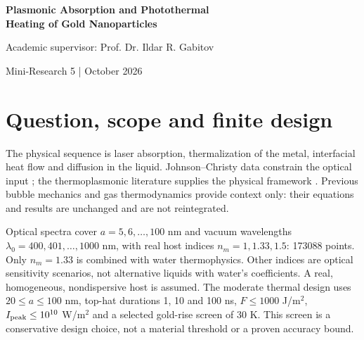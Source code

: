 \documentclass[10pt,a4paper]{article}
\begin{document}
\begin{center}
{\LARGE\bfseries Plasmonic Absorption and Photothermal\\[3pt] Heating of Gold Nanoparticles}\par
\vspace{6pt}{\large Dimitri Bolt}\par
Academic supervisor: Prof. Dr. Ildar R. Gabitov\par
Mini-Research 5 \quad |  October 2026
\end{center}
\begin{abstract}
I quantify the optical-energy channel from laser irradiation to isolated gold spheres and surrounding water. Experimental room-temperature optical constants, a passive dipole approximation and a converged Mie calculation are linked to depth-integrated attenuation and an energy-conservative transient conduction model. The objectives of maximizing one-particle absorption, absorption per gold volume and the absorbed fraction of a finite beam differ. In the declared moderate-heating design, a 100 nm radius sphere absorbs \SinglePJ\ pJ in 100 ns; a finite 0.785 mJ pulse deposits \EnsembleMicroJ\ $\mu$J in a dilute 10 mm layer. These are conditional model estimates. More extreme linear continuations are retained with explicit failures of thermal equilibrium, constant optical response and phase stability. No universal maximum, bubble temperature or laser-to-bubble efficiency is inferred.
\end{abstract}

\section{Question, scope and finite design}
The physical sequence is laser absorption, thermalization of the metal, interfacial heat flow and diffusion in the liquid. Johnson--Christy data constrain the optical input \cite{JC}; the thermoplasmonic literature supplies the physical framework \cite{BQ,BR,Jain}. Previous bubble mechanics and gas thermodynamics provide context only: their equations and results are unchanged and are not reintegrated.

Optical spectra cover $a=5,6,\ldots,100$ nm and vacuum wavelengths $\lambda_0=400,401,\ldots,1000$ nm, with real host indices $n_m=1,1.33,1.5$: 173088 points. Only $n_m=1.33$ is combined with water thermophysics. Other indices are optical sensitivity scenarios, not alternative liquids with water's coefficients. A real, homogeneous, nondispersive host is assumed. The moderate thermal design uses $20\leq a\leq100$ nm, top-hat durations 1, 10 and 100 ns, $F\leq1000$ J/m$^2$, $I_{\rm peak}\leq10^{10}$ W/m$^2$ and a selected gold-rise screen of 30 K. This screen is a conservative design choice, not a material threshold or a proven accuracy bound.
\end{document}
